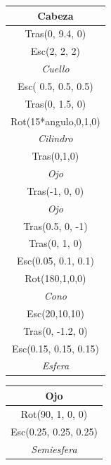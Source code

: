 \documentclass{article}
\begin{document}
\begin{table}[h!]
	\centering
	\label{4}
	\begin{tabular}{|c|}
		\hline
		\textbf{Cabeza}\\ \hline
		Tras(0, 9.4, 0)\\ \hline
		Esc(2, 2, 2)\\ \hline
		\textit{Cuello}\\ \hline
		Esc( 0.5, 0.5, 0.5)\\ \hline
		Tras(0, 1.5, 0)\\ \hline
		Rot(15*angulo,0,1,0)\\ \hline
		\textit{Cilindro}\\ \hline
		Tras(0,1,0)\\ \hline
		\textit{Ojo}\\ \hline
		Tras(-1, 0, 0)\\ \hline
		\textit{Ojo}\\ \hline
		Tras(0.5, 0, -1)\\ \hline
		Tras(0, 1, 0)\\ \hline
		Esc(0.05, 0.1, 0.1)\\ \hline
		Rot(180,1,0,0)\\ \hline
		\textit{Cono}\\ \hline
		Esc(20,10,10)\\ \hline
		Tras(0, -1.2, 0)\\ \hline
		Esc(0.15, 0.15, 0.15)\\ \hline
		\textit{Esfera}\\ \hline
	\end{tabular}
\end{table}

\begin{table}[h!]
	\centering
	\label{3}
	\begin{tabular}{|c|}
		\hline
		\textbf{Ojo}\\ \hline
		Rot(90, 1, 0, 0)\\ \hline
		Esc(0.25, 0.25, 0.25)\\ \hline
		\textit{Semiesfera}\\ \hline
	\end{tabular}
\end{table}
\end{document}
